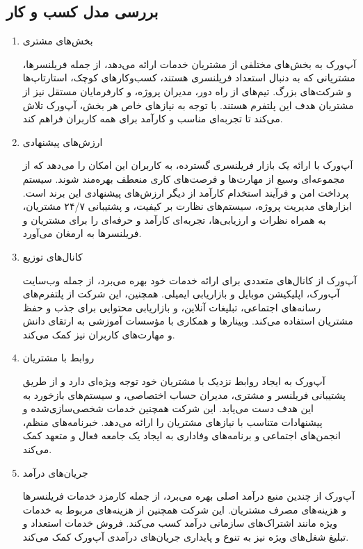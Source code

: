 \documentclass[dvipsnames, svgnames, x11names, 11pt, twocolumn]{article}
\begin{document}
\subsection{بررسی مدل کسب و کار}
\begin{enumerate}
\item 
بخش‌های مشتری 

آپ‌ورک به بخش‌های مختلفی از مشتریان خدمات ارائه می‌دهد، از جمله فریلنسرها، مشتریانی که به دنبال استعداد فریلنسری هستند، کسب‌وکارهای کوچک، استارتاپ‌ها و شرکت‌های بزرگ. تیم‌های از راه دور، مدیران پروژه، و کارفرمایان مستقل نیز از مشتریان هدف این پلتفرم هستند. با توجه به نیازهای خاص هر بخش، آپ‌ورک تلاش می‌کند تا تجربه‌ای مناسب و کارآمد برای همه کاربران فراهم کند.

\item
ارزش‌های پیشنهادی 

آپ‌ورک با ارائه یک بازار فریلنسری گسترده، به کاربران این امکان را می‌دهد که از مجموعه‌ای وسیع از مهارت‌ها و فرصت‌های کاری منعطف بهره‌مند شوند. سیستم پرداخت امن و فرآیند استخدام کارآمد از دیگر ارزش‌های پیشنهادی این برند است. ابزارهای مدیریت پروژه، سیستم‌های نظارت بر کیفیت، و پشتیبانی ۲۴/۷ مشتریان، به همراه نظرات و ارزیابی‌ها، تجربه‌ای کارآمد و حرفه‌ای را برای مشتریان و فریلنسرها به ارمغان می‌آورد.

\item 
کانال‌های توزیع 

آپ‌ورک از کانال‌های متعددی برای ارائه خدمات خود بهره می‌برد، از جمله وب‌سایت آپ‌ورک، اپلیکیشن موبایل و بازاریابی ایمیلی. همچنین، این شرکت از پلتفرم‌های رسانه‌های اجتماعی، تبلیغات آنلاین، و بازاریابی محتوایی برای جذب و حفظ مشتریان استفاده می‌کند. وبینارها و همکاری با مؤسسات آموزشی به ارتقای دانش و مهارت‌های کاربران نیز کمک می‌کند.

\item
روابط با مشتریان 

آپ‌ورک به ایجاد روابط نزدیک با مشتریان خود توجه ویژه‌ای دارد و از طریق پشتیبانی فریلنسر و مشتری، مدیران حساب اختصاصی، و سیستم‌های بازخورد به این هدف دست می‌یابد. این شرکت همچنین خدمات شخصی‌سازی‌شده و پیشنهادات متناسب با نیازهای مشتریان را ارائه می‌دهد. خبرنامه‌های منظم، انجمن‌های اجتماعی و برنامه‌های وفاداری به ایجاد یک جامعه فعال و متعهد کمک می‌کند.

\item
جریان‌های درآمد 

آپ‌ورک از چندین منبع درآمد اصلی بهره می‌برد، از جمله کارمزد خدمات فریلنسرها و هزینه‌های مصرف مشتریان. این شرکت همچنین از هزینه‌های مربوط به خدمات ویژه مانند اشتراک‌های سازمانی درآمد کسب می‌کند. فروش خدمات استعداد  و تبلیغ شغل‌های ویژه  نیز به تنوع و پایداری جریان‌های درآمدی آپ‌ورک کمک می‌کند.


\end{enumerate}
\end{document}

